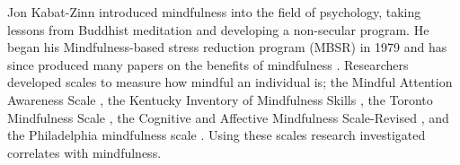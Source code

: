 Jon Kabat-Zinn introduced mindfulness into the field of psychology, taking lessons from Buddhist meditation and developing a non-secular program. He began his Mindfulness-based stress reduction program (MBSR) in 1979 and has since produced many papers on the benefits of mindfulness \citep{kabat-zinn_outpatient_1982,kabat-zinn_clinical_1985,kabat-zinn_effectiveness_1992,miller_three-year_1995,kabat-zinn_influence_1998,samuelson_mindfulness-based_2007,ludwig_mindfulness_2008}. Researchers developed scales to measure how mindful an individual is; the Mindful Attention Awareness Scale \citep{brown_benefits_2003}, the Kentucky Inventory of Mindfulness Skills \citep{baer_assessment_2004}, the Toronto Mindfulness Scale \citep{lau_toronto_2006}, the Cognitive and Affective Mindfulness Scale-Revised \citep{feldman_mindfulness_2007}, and the Philadelphia mindfulness scale \citep{cardaciotto_assessment_2008}. Using these scales research investigated correlates with mindfulness.
  